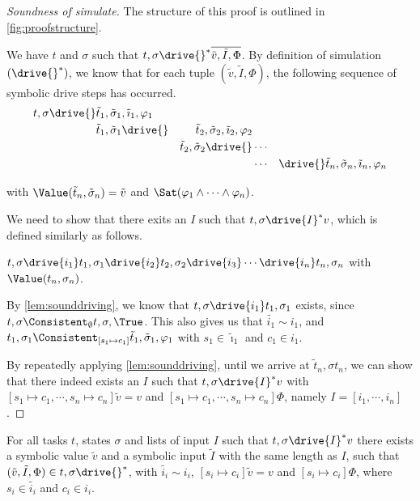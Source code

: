 \begin{proof}[Soundness of simulate]
  The structure of this proof is outlined in \cref{fig:proofstructure}.

  We have $t$ and $\sigma$ such that $t,\sigma\drive{}^*\overline{\tilde{v},\tilde{I},\Phi}$.
  By definition of simulation $(\drive{}^*)$, we know that for each tuple $(\tilde{v},\tilde{I},\Phi)$,
  the following sequence of symbolic drive steps has occurred.
  \begin{align*}
      t,\sigma\drive{}&\tilde{t}_1,\tilde{\sigma}_1,\tilde{\imath}_1,\phi_1&\\
                      &\tilde{t}_1,\tilde{\sigma}_1\drive{}&\tilde{t}_2,\tilde{\sigma}_2,\tilde{\imath}_2,\phi_2\\
                      &                                    &\tilde{t}_2,\tilde{\sigma}_2\drive{}&\cdots&\\
                      &                                    &                                    &\cdots&
                      \drive{}\tilde{t}_n,\tilde{\sigma}_n,\tilde{\imath}_n,\phi_n
  \end{align*}

  with $\Value(\tilde{t}_n,\tilde{\sigma}_n)=\tilde{v}$ and $\Sat(\phi_1\land\cdots\land\phi_n)$.

  We need to show that there exits an $I$ such that $t,\sigma\drive{I}^*v$, which is defined similarly as follows.

  $t,\sigma\drive{i_1}t_1,\sigma_1\drive{i_2}t_2,\sigma_2\drive{i_3}\cdots \drive{i_n}t_n,\sigma_n$ with $\Value(t_n,\sigma_n)$.

  By \cref{lem:sounddriving}, we know that $t,\sigma\drive{i_1}t_1,\sigma_1$ exists, since $t,\sigma\Consistent_{\emptyset}t,\sigma,\True$.
  This also gives us that $\tilde{i_1}\sim i_1$, and $t_1,\sigma_1\Consistent_{[s_1\mapsto c_1]}\tilde{t}_1,\tilde{\sigma}_1,\phi_1$ with $s_1\in\tilde{\imath}_1$ and $c_1\in i_1$.

  By repeatedly applying \cref{lem:sounddriving}, until we arrive at $\tilde{t}_n,\sigma{t}_n$,
  we can show that there indeed exists an $I$ such that $t,\sigma\drive{I}^*v$ with $[s_1\mapsto c_1,\cdots,s_n\mapsto c_n]\tilde{v}=v$
  and $[s_1\mapsto c_1,\cdots,s_n\mapsto c_n]\Phi$, namely $I=[i_1,\cdots,i_n]$.

\end{proof}

\begin{lemma}
  \label{lem:completesimulate}
  For all tasks $t$, states $\sigma$ and lists of input $I$
  such that $t,\sigma\drive{I}^*v$
  there exists a symbolic value $\tilde{v}$ and a symbolic input $\tilde{I}$ with the same length as $I$,
  such that $(\tilde{v},\tilde{I},\Phi)\in t,\sigma\drive{}^*$,
  with $\tilde{i_i}\sim i_i$, $[s_i\mapsto c_i]\tilde{v}=v$ and $[s_i\mapsto c_i]\Phi$,
  where $s_i\in\tilde{i_i}$ and $c_i\in i_i$.
\end{lemma}


